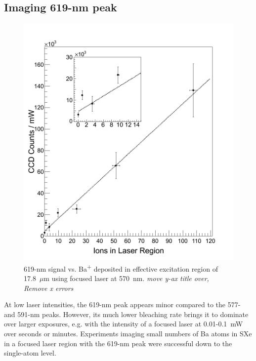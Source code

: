 \subsection{Imaging 619-nm peak}

\begin{figure} %
        \centering
                \includegraphics[width=.99\textwidth]{figures/fitgrouped_20150807_20150916_inset.png}
                \caption{619-nm signal vs. Ba\textsuperscript{+} deposited in effective excitation region of 17.8~$\mu$m using focused laser at 570~nm. \emph{\color{red}move y-ax title over, Remove x errors}}
\label{fig:lin}
\end{figure}

At low laser intensities, the 619-nm peak appears minor compared to the 577- and 591-nm peaks.  However, its much lower bleaching rate brings it to dominate over larger exposures, e.g. with the intensity of a focused laser at 0.01-0.1~mW over seconds or minutes.  Experiments imaging small numbers of Ba atoms in SXe in a focused laser region with the 619-nm peak were successful down to the single-atom level.

